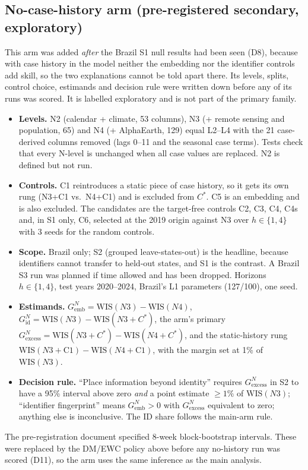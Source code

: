 \documentclass[11pt]{article}
\newcommand{\WIS}{\mathrm{WIS}}
\newcommand{\Gemb}{G_{\mathrm{emb}}}
\newcommand{\Gid}{G_{\mathrm{id}}}
\newcommand{\Gex}{G_{\mathrm{excess}}}
\newcommand{\Cstar}{C^{\ast}}
\begin{document}
\subsection{No-case-history arm (pre-registered secondary, exploratory)}
\label{sec:nohist}
This arm was added \emph{after} the Brazil S1 null results had been seen (D8), because with case history
in the model neither the embedding nor the identifier controls add skill, so the two explanations cannot be
told apart there. Its levels, splits, control choice, estimands and decision rule were written down before
any of its runs was scored. It is labelled exploratory and is not part of the primary family.
\begin{itemize}
  \item \textbf{Levels.} N2 (calendar + climate, 53 columns), N3 (+ remote sensing and population, 65) and
  N4 (+ AlphaEarth, 129) equal L2--L4 with the 21 case-derived columns removed (lags 0--11 and the
  seasonal case terms). Tests check that every N-level is unchanged when all case values are replaced.
  N2 is defined but not run.
  \item \textbf{Controls.} C1 reintroduces a static piece of case history, so it gets its own rung
  (N3+C1 vs.\ N4+C1) and is excluded from $\Cstar$. C5 is an embedding and is also excluded. The
  candidates are the target-free controls C2, C3, C4, C4s and, in S1 only, C6, selected at the 2019 origin
  against N3 over $h\in\{1,4\}$ with 3 seeds for the random controls.
  \item \textbf{Scope.} Brazil only; S2 (grouped leave-states-out) is the headline, because identifiers
  cannot transfer to held-out states, and S1 is the contrast. A Brazil S3 run was planned if time allowed
  and has been dropped. Horizons $h\in\{1,4\}$, test years 2020--2024, Brazil's L1 parameters (127/100),
  one seed.
  \item \textbf{Estimands.} $\Gemb^N=\WIS(N3)-\WIS(N4)$, $\Gid^N=\WIS(N3)-\WIS(N3{+}\Cstar)$, the arm's
  primary $\Gex^N=\WIS(N3{+}\Cstar)-\WIS(N4{+}\Cstar)$, and the static-history rung
  $\WIS(N3{+}\text{C1})-\WIS(N4{+}\text{C1})$, with the margin set at 1\% of $\WIS(N3)$.
  \item \textbf{Decision rule.} ``Place information beyond identity'' requires $\Gex^N$ in S2 to have a
  95\% interval above zero \emph{and} a point estimate $\geq 1\%$ of $\WIS(N3)$; ``identifier
  fingerprint'' means $\Gemb^N>0$ with $\Gex^N$ equivalent to zero; anything else is inconclusive. The ID
  share follows the main-arm rule.
\end{itemize}
The pre-registration document specified 8-week block-bootstrap intervals. These were replaced by the
DM/EWC policy above before any no-history run was scored (D11), so the arm uses the same inference as the
main analysis.
\end{document}
